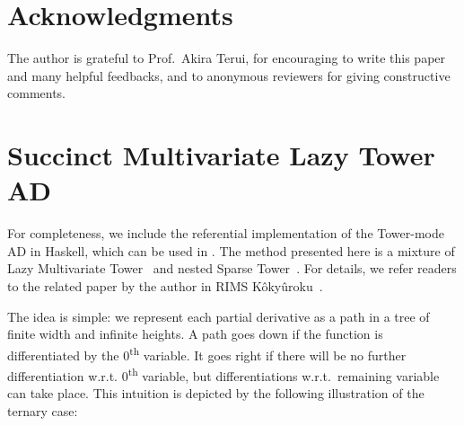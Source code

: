 \section*{Acknowledgments}
The author is grateful to Prof.\ Akira Terui, for encouraging to write this paper and many helpful feedbacks, and to anonymous reviewers for giving constructive comments.
\appendix
\section{Succinct Multivariate Lazy Tower AD}\label{sec:appendix}
For completeness, we include the referential implementation of the Tower-mode AD in Haskell, which can be used in .
The method presented here is a mixture of Lazy Multivariate Tower~\cite{Pearlmutter:2007aa} and nested Sparse Tower~\cite{Kmett:2010aa}.
For details, we refer readers to the related paper by the author in RIMS K\^{o}ky\^{u}roku~\cite{Ishii:2021ab}.

The idea is simple: we represent each partial derivative as a path in a tree of finite width and infinite heights.
A path goes down if the function is differentiated by the 0\textsuperscript{th} variable.
It goes right if there will be no further differentiation w.r.t. 0\textsuperscript{th} variable, but differentiations w.r.t.\ remaining variable can take place.
This intuition is depicted by the following illustration of the ternary case:

\begin{center}
\end{center}

